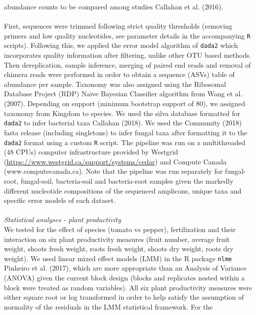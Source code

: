 \documentclass[11pt,]{article}
\begin{document}
abundance counts to be compared among studies Callahan et al. (2016).\\
\hspace*{0.333em}\\
First, sequences were trimmed following strict quality thresholds
(removing primers and low quality nucleotides, see parameter details in
the accompanying \texttt{R} scripts). Following this, we applied the
error model algorithm of \texttt{dada2} which incorporates quality
information after filtering, unlike other OTU based methods. Then
dereplication, sample inference, merging of paired end reads and removal
of chimera reads were performed in order to obtain a sequence (ASVs)
table of abundance per sample. Taxonomy was also assigned using the
Ribosomal Database Project (RDP) Naive Bayesian Classifier algorithm
from Wang et al. (2007). Depending on support (minimum bootstrap support
of 80), we assigned taxonomy from Kingdom to species. We used the silva
database formatted for \texttt{dada2} to infer bacterial taxa Callahan
(2018). We used the Community (2018) fasta release (including
singletons) to infer fungal taxa after formatting it to the
\texttt{dada2} format using a custom \texttt{R} script. The pipeline was
run on a multithreaded (48 CPUs) computer infrastructure provided by
Westgrid (\url{https://www.westgrid.ca/support/systems/cedar}) and
Compute Canada (www.computecanada.ca). Note that the pipeline was run
separately for fungal-root, fungal-soil, bacteria-soil and bacteria-root
samples given the markedly different nucleotide compositions of the
sequenced amplicons, unique taxa and specific error models of each
dataset. ~\\
\hspace*{0.333em}\\
\emph{Statistical analyses - plant productivity}\\
We tested for the effect of species (tomato vs pepper), fertilization
and their interaction on six plant productivity measures (fruit number,
average fruit weight, shoots fresh weight, roots fresh weight, shoots
dry weight, roots dry weight). We used linear mixed effect models (LMM)
in the R package \texttt{nlme} Pinheiro et al. (2017), which are more
appropriate than an Analysis of Variance (ANOVA) given the current block
design (blocks and replicates nested within a block were treated as
random variables). All six plant productivity measures were either
square root or log transformed in order to help satisfy the assumption
of normality of the residuals in the LMM statistical framework. For the
\end{document}
